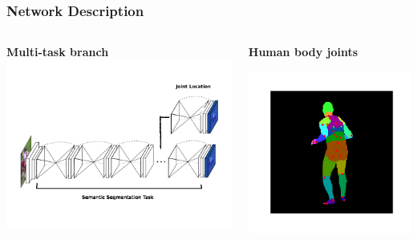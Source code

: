 \documentclass{beamer}
\begin{document}
\begin{frame}
\frametitle{Network Description}

\begin{columns}
\begin{center}
\textbf{Multi-task branch}\\


\includegraphics[scale=0.2]{multitask.png}
\end{center}

\begin{center}
\textbf{Human body joints}

\includegraphics[scale=0.23]{surreal_joints.png}
\end{center}
\end{columns}

\end{frame}
\end{document}
